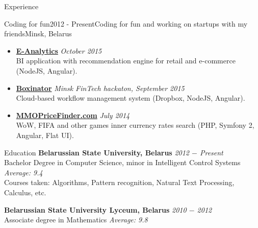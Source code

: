 \documentclass{resume} %
\begin{document}
\begin{rSection}{Experience}
\begin{rSubsection}{Coding for fun}{2012 - Present}{Coding for fun and working on startups with my friends}{Minsk, Belarus}
\begin{itemize}[leftmargin=*,label={$+$}]
  \item {\bf \href{http://pirateminds.com/e-analytics}{E-Analytics}} \hfill {\em October 2015} \\
	BI application with recommendation engine for retail and e-commerce (NodeJS, Angular).

  \item {\bf \href{http://boxinator.xyz}{Boxinator}} \hfill {\em Minsk FinTech hackaton, September 2015} \\
	Cloud-based workflow management system (Dropbox, NodeJS, Angular).

  \item {\bf \href{http://mmopricefinder.com}{MMOPriceFinder.com}} \hfill {\em July 2014} \\
	WoW, FIFA and other games inner currency rates search (PHP, Symfony 2, Angular, Flat UI).

\end{itemize}
\end{rSubsection}
\end{rSection}


\begin{rSection}{Education}
{\bf Belarussian State University, Belarus} \hfill {\em 2012 $-$ Present} \\
Bachelor Degree in Computer Science, minor in Intelligent Control Systems \hfill {\em Average: 9.4} \\
Courses taken: Algorithms, Pattern recognition, Natural Text Processing, Calculus, etc.

{\bf Belarussian State University Lyceum, Belarus} \hfill {\em 2010 $-$ 2012} \\
Associate degree in Mathematics \hfill {\em Average: 9.8}

\end{rSection}

\end{document}
